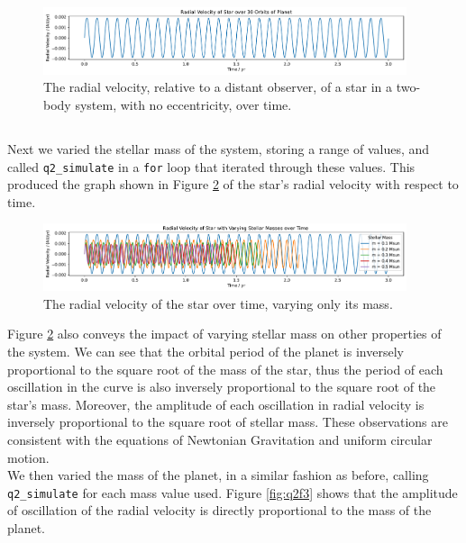 \documentclass{article}
\newcommand{\for}{\texttt{for}}
\newcommand{\simf}{\texttt{q2\_simulate}}
\begin{document}
\begin{figure}[htp]
    \centering
    \includegraphics[width=0.95\textwidth]{q2f1.pdf}
    \captionsetup{justification=centering}
    \caption{The radial velocity, relative to a distant observer, of a star in a two-body system, with no eccentricity, over time.}
    \label{fig:q2f1}
\end{figure}

\subsection{}
Next we varied the stellar mass of the system, storing a range of values, and called \simf{} in a \for{} loop that iterated through these values. This produced the graph shown in Figure \ref{fig:q2f2} of the star's radial velocity with respect to time. 

\begin{figure}[htp]
    \centering
    \includegraphics[width=0.95\textwidth]{q2f2.pdf}
    \captionsetup{justification=centering}
    \caption{The radial velocity of the star over time, varying only its mass.}
    \label{fig:q2f2}
\end{figure}

\newpage

Figure \ref{fig:q2f2} also conveys the impact of varying stellar mass on other properties of the system. We can see that the orbital period of the planet is inversely proportional to the square root of the mass of the star, thus the period of each oscillation in the curve is also inversely proportional to the square root of the star's mass. Moreover, the amplitude of each oscillation in radial velocity is inversely proportional to the square root of stellar mass. These observations are consistent with the equations of Newtonian Gravitation and uniform circular motion.  \\

We then varied the mass of the planet, in a similar fashion as before, calling \simf{} for each mass value used. Figure \ref{fig:q2f3} shows that the amplitude of oscillation of the radial velocity is directly proportional to the mass of the planet. 
\end{document}
